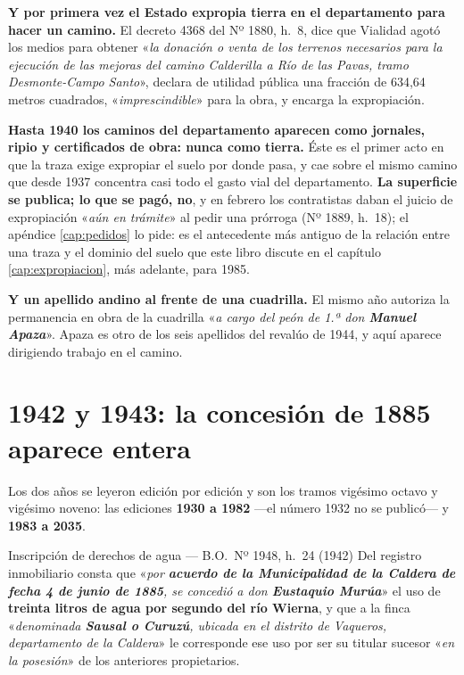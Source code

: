 \begin{cautela}
\textbf{Y por primera vez el Estado expropia tierra en el departamento para hacer
un camino.} El decreto 4368 del Nº 1880, h.\ 8, dice que Vialidad agotó los
medios para obtener «\textit{la donación o venta de los terrenos necesarios para la
ejecución de las mejoras del camino Calderilla a Río de las Pavas, tramo
Desmonte-Campo Santo}», declara de utilidad pública una fracción de 634,64
metros cuadrados, «\textit{imprescindible}» para la obra, y encarga la expropiación.

\textbf{Hasta 1940 los caminos del departamento aparecen como jornales, ripio y
certificados de obra: nunca como tierra.} Éste es el primer acto en que la traza
exige expropiar el suelo por donde pasa, y cae sobre el mismo camino que desde
1937 concentra casi todo el gasto vial del departamento. \textbf{La superficie
se publica; lo que se pagó, no}, y en febrero los contratistas daban el juicio
de expropiación «\textit{aún en trámite}» al pedir una prórroga (Nº 1889, h.\ 18); el apéndice
\ref{cap:pedidos} lo pide: es el antecedente más antiguo de la relación entre
una traza y el dominio del suelo que este libro discute en el capítulo
\ref{cap:expropiacion}, más adelante, para 1985.

\textbf{Y un apellido andino al frente de una cuadrilla.} El mismo año autoriza
la permanencia en obra de la cuadrilla «\textit{a cargo del peón de 1.ª don
\textbf{Manuel Apaza}}». Apaza es otro de los seis apellidos del revalúo de 1944,
y aquí aparece dirigiendo trabajo en el camino.
\end{cautela}

\section{1942 y 1943: la concesión de 1885 aparece entera}

Los dos años se leyeron edición por edición y son los tramos vigésimo octavo y
vigésimo noveno: las ediciones \textbf{1930 a 1982} ---el número 1932 no se publicó--- y \textbf{1983 a 2035}.

\begin{ficha}{Inscripción de derechos de agua --- B.O.\ Nº 1948, h.\ 24 (1942)}
Del registro inmobiliario consta que «\textit{por \textbf{acuerdo de la
Municipalidad de la Caldera de fecha 4 de junio de 1885}, se concedió a don
\textbf{Eustaquio Murúa}}» el uso de \textbf{treinta
litros de agua por segundo del río Wierna}, y que a la finca «\textit{denominada
\textbf{Sausal o Curuzú}, ubicada en el distrito de Vaqueros, departamento de la
Caldera}» le corresponde ese uso por ser su titular sucesor «\textit{en la
posesión}» de los anteriores propietarios.
\end{ficha}

